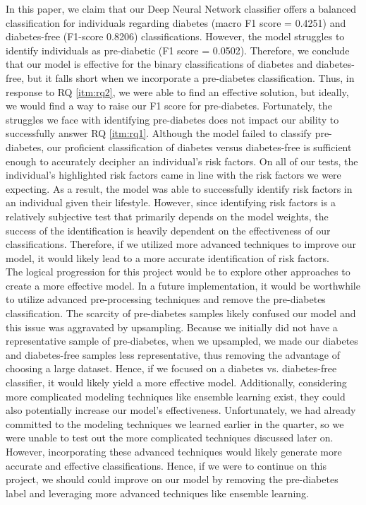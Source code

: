 \documentclass[conference]{IEEEtran}
\begin{document}
In this paper, we claim that our Deep Neural Network classifier offers a balanced classification for individuals regarding diabetes (macro F1 score = 0.4251) and diabetes-free (F1-score 0.8206) classifications. However, the model struggles to identify individuals as pre-diabetic (F1 score = 0.0502). Therefore, we conclude that our model is effective for the binary classifications of diabetes and diabetes-free, but it falls short when we incorporate a pre-diabetes classification. Thus, in response to RQ \ref{itm:rq2}, we were able to find an effective solution, but ideally, we would find a way to raise our F1 score for pre-diabetes. Fortunately, the struggles we face with identifying pre-diabetes does not impact our ability to successfully answer RQ \ref{itm:rq1}. Although the model failed to classify pre-diabetes, our proficient classification of diabetes versus diabetes-free is sufficient enough to accurately decipher an individual’s risk factors. On all of our tests, the individual’s highlighted risk factors came in line with the risk factors we were expecting. As a result, the model was able to successfully identify risk factors in an individual given their lifestyle. However, since identifying risk factors is a relatively subjective test that primarily depends on the model weights, the success of the identification is heavily dependent on the effectiveness of our classifications. Therefore, if we utilized more advanced techniques to improve our model, it would likely lead to a more accurate identification of risk factors. \\
\indent The logical progression for this project would be to explore other approaches to create a more effective model. In a future implementation, it would be worthwhile to utilize advanced pre-processing techniques and remove the pre-diabetes classification. The scarcity of pre-diabetes samples likely confused our model and this issue was aggravated by upsampling. Because we initially did not have a representative sample of pre-diabetes, when we upsampled, we made our diabetes and diabetes-free samples less representative, thus removing the advantage of choosing a large dataset. Hence, if we focused on a diabetes vs. diabetes-free classifier, it would likely yield a more effective model. Additionally, considering more complicated modeling techniques like ensemble learning exist, they could also potentially increase our model’s effectiveness. Unfortunately, we had already committed to the modeling techniques we learned earlier in the quarter, so we were unable to test out the more complicated techniques discussed later on. However, incorporating these advanced techniques would likely generate more accurate and effective classifications. Hence, if we were to continue on this project, we should could improve on our model by removing the pre-diabetes label and leveraging more advanced techniques like ensemble learning.
\end{document}
